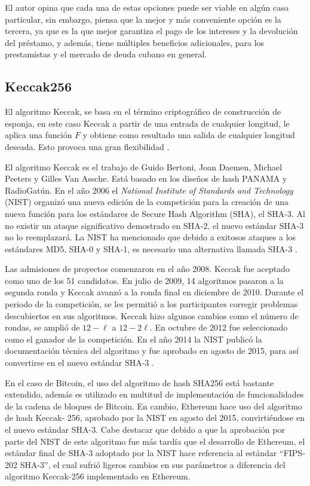     El autor opina que cada una de estas opciones puede ser viable en algún caso particular, sin embargo, piensa que la mejor y más 
    conveniente opción 
    es la tercera, ya que es la que mejor garantiza el pago de los intereses y la devolución del préstamo, y además, tiene múltiples
    beneficios adicionales, para los prestamistas y el mercado de deuda cubano en general.

  \subsection{Keccak256}
    El algoritmo Keccak, se basa en el término criptográfico de construcción de esponja, en este caso 
    Keccak a partir de una entrada de cualquier longitud, le aplica una función $F$ y obtiene como resultado 
    una salida de cualquier longitud deseada. Esto provoca una gran flexibilidad \parencite{bertoni2007}.

    El algoritmo Keccak es el trabajo de Guido Bertoni, Joan Daemen, Michael Peeters y Gilles Van Assche. Está basado en los diseños de 
    hash PANAMA y RadioGatún. En el año 2006 el \textit{National Institute of Standards and Technology} (NIST) organizó una nueva edición de la competición para la creación de una nueva función 
    para los estándares de Secure Hash Algorithm (SHA), el SHA-3. Al no existir un ataque significativo demostrado en SHA-2, el nuevo 
    estándar SHA-3 no lo reemplazará. La NIST ha mencionado que debido a exitosos ataques a los estándares MD5, SHA-0 y SHA-1, es 
    necesario una alternativa llamada SHA-3 \parencite{stevens2017}.

    Las admisiones de proyectos comenzaron en el año 2008. Keccak fue aceptado como uno de los 51 candidatos. En julio de 2009, 14 
    algoritmos pasaron a la segunda ronda y Keccak avanzó a la ronda final en diciembre de 2010. Durante el periodo de la competición, se 
    les permitió a los participantes corregir problemas descubiertos en sus algoritmos. Keccak hizo algunos cambios como el número de 
    rondas, se amplió de ${\displaystyle 12-\ell}$ a ${\displaystyle 12-2\ell }$. En 
    octubre de 2012 fue seleccionado como el ganador de la competición. En el año 2014 la NIST publicó la documentación técnica del 
    algoritmo y fue aprobado en agosto de 2015, para así convertirse en el nuevo estándar SHA-3 \parencite{nist2015}.

    En el caso de Bitcoin, el uso del algoritmo de hash SHA256 está bastante extendido,
    además es utilizado en multitud de implementación de funcionalidades de la cadena
    de bloques de Bitcoin. En cambio, Ethereum hace uso del algoritmo de hash Keccak-
    256, aprobado por la NIST en agosto del 2015, convirtiéndose en el nuevo estándar
    SHA-3.
    Cabe destacar que debido a que la aprobación por parte del NIST de este algoritmo fue más tardía que el desarrollo de Ethereum, el 
    estándar final de SHA-3 adoptado por
    la NIST hace referencia al estándar “FIPS-202 SHA-3”, el cual sufrió ligeros cambios
    en sus parámetros a diferencia del algoritmo Keccak-256 implementado en Ethereum.

